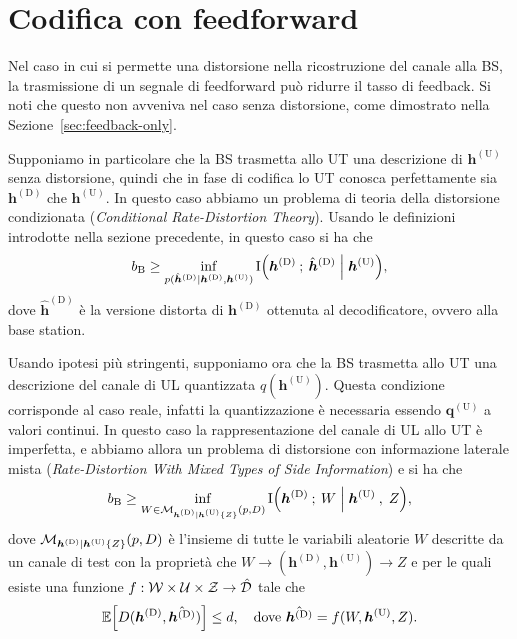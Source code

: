 \section{Codifica con feedforward}
\label{sec:with-feedforward}

Nel caso in cui si permette una distorsione nella ricostruzione del canale alla
BS, la trasmissione di un segnale di feedforward può ridurre il tasso di
feedback. Si noti che questo non avveniva nel caso senza distorsione, come
dimostrato nella Sezione~\ref{sec:feedback-only}.

Supponiamo in particolare che la BS trasmetta allo UT una descrizione di
\(\bm{h}^\mathrm{(U)}\) senza distorsione, quindi che in fase di codifica lo UT
conosca perfettamente sia \(\bm{h}^\mathrm{(D)}\) che \(\bm{h}^\mathrm{(U)}\).
In questo caso abbiamo un problema di teoria della distorsione condizionata
(\textit{Conditional Rate-Distortion Theory}). Usando le definizioni introdotte
nella sezione precedente, in questo caso si ha \cite{Gray1972ConditionalRT} che
\begin{equation}
    b_\mathrm{B} \ge \inf_{p(
        \hat{\bm{h}}^\mathrm{(D)} \mid \bm{h}^\mathrm{(D)}, \bm{h}^\mathrm{(U)}
    )}
    \mutual{
        \bm{h}^\mathrm{(D)}
    }{
        \hat{\bm{h}}^\mathrm{(D)} \given \bm{h}^\mathrm{(U)}
    } , \label{eq:rate-with-wz-and-feedforward}
\end{equation}
dove \(\hat{\bm{h}}^\mathrm{(D)}\) è la versione distorta di
\(\bm{h}^\mathrm{(D)}\) ottenuta al decodificatore, ovvero alla base station.

Usando ipotesi più stringenti, supponiamo ora che la BS trasmetta allo UT una
descrizione del canale di UL quantizzata \(q(\bm{h}^\mathrm{(U)})\). Questa
condizione corrisponde al caso reale, infatti la quantizzazione è necessaria
essendo \(\bm{q}^\mathrm{(U)}\) a valori continui. In questo caso la
rappresentazione del canale di UL allo UT è imperfetta, e abbiamo allora un
problema di distorsione con informazione laterale mista
(\textit{Rate-Distortion With Mixed Types of Side Information}) e si ha
\cite{1614094} che
\begin{equation}
    b_\mathrm{B} \ge \inf_{W \in \set{M}_{
        \bm{h}^\mathrm{(D)} \mid \bm{h}^\mathrm{(U)} \{Z\}
    }(p, D)} \mutual{
        \bm{h}^\mathrm{(D)}
    }{
        W \given \bm{h}^\mathrm{(U)} \:,\; Z
    } , \label{eq:rate-with-wz-mixed-si}
\end{equation}
dove \(\mathcal{M}_{\bm{h}^\mathrm{(D)} \mid \bm{h}^\mathrm{(U)} \{Z\}}(p, D)\) è
l'insieme di tutte le variabili aleatorie \(W\) descritte da un canale di test
con la proprietà che \(W \to (\bm{h}^\mathrm{(D)}, \bm{h}^\mathrm{(U)}) \to Z\)
e per le quali esiste una funzione \(f: \mathcal{W} \times \mathcal{U} \times \mathcal{Z}
\to \hat{\mathcal{D}}\) tale che
\begin{equation}
    \expect{D(\bm{h}^\mathrm{(D)}, \hat{\bm{h}^\mathrm{(D)}})} \le d, \quad
    \textrm{dove } \hat{\bm{h}^\mathrm{(D)}} = f(W, \bm{h}^\mathrm{(U)}, Z) .
\end{equation}
